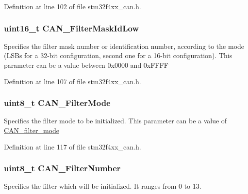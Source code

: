 Definition at line 102 of file stm32f4xx\-\_\-can.\-h.

\hypertarget{struct_c_a_n___filter_init_type_def_a3677d330355ee09293b3ee8c055b58a5}{
\subsubsection[{C\-A\-N\-\_\-\-Filter\-Mask\-Id\-Low}]{\setlength{\rightskip}{0pt plus 5cm}uint16\-\_\-t C\-A\-N\-\_\-\-Filter\-Mask\-Id\-Low}}\label{struct_c_a_n___filter_init_type_def_a3677d330355ee09293b3ee8c055b58a5}
Specifies the filter mask number or identification number, according to the mode (L\-S\-Bs for a 32-\/bit configuration, second one for a 16-\/bit configuration). This parameter can be a value between 0x0000 and 0x\-F\-F\-F\-F 

Definition at line 107 of file stm32f4xx\-\_\-can.\-h.

\hypertarget{struct_c_a_n___filter_init_type_def_a0fecca0da838d863a15294277db8f8fe}{
\subsubsection[{C\-A\-N\-\_\-\-Filter\-Mode}]{\setlength{\rightskip}{0pt plus 5cm}uint8\-\_\-t C\-A\-N\-\_\-\-Filter\-Mode}}\label{struct_c_a_n___filter_init_type_def_a0fecca0da838d863a15294277db8f8fe}
Specifies the filter mode to be initialized. This parameter can be a value of \hyperlink{group___c_a_n__filter__mode}{C\-A\-N\-\_\-filter\-\_\-mode} 

Definition at line 117 of file stm32f4xx\-\_\-can.\-h.

\hypertarget{struct_c_a_n___filter_init_type_def_a4657eff323f0e2d379115fd06f5c8d74}{
\subsubsection[{C\-A\-N\-\_\-\-Filter\-Number}]{\setlength{\rightskip}{0pt plus 5cm}uint8\-\_\-t C\-A\-N\-\_\-\-Filter\-Number}}\label{struct_c_a_n___filter_init_type_def_a4657eff323f0e2d379115fd06f5c8d74}
Specifies the filter which will be initialized. It ranges from 0 to 13. 

